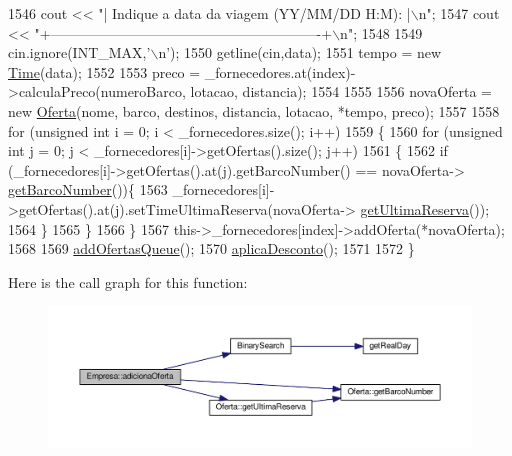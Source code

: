\begin{DoxyCode}
1546     cout << \textcolor{stringliteral}{"| Indique a data da viagem (YY/MM/DD H:M):                 |\(\backslash\)n"};
1547     cout << \textcolor{stringliteral}{"+----------------------------------------------------------+\(\backslash\)n"};
1548 
1549     cin.ignore(INT\_MAX,\textcolor{charliteral}{'\(\backslash\)n'});
1550     getline(cin,data);
1551     tempo = \textcolor{keyword}{new} \hyperlink{classTime}{Time}(data);
1552 
1553     preco = \_fornecedores.at(index)->calculaPreco(numeroBarco, lotacao, distancia);
1554     
1555     
1556     novaOferta = \textcolor{keyword}{new} \hyperlink{classOferta}{Oferta}(nome, barco, destinos, distancia, lotacao, *tempo, preco);
1557 
1558     \textcolor{keywordflow}{for} (\textcolor{keywordtype}{unsigned} \textcolor{keywordtype}{int} i = 0; i < \_fornecedores.size(); i++)
1559     \{
1560         \textcolor{keywordflow}{for} (\textcolor{keywordtype}{unsigned} \textcolor{keywordtype}{int} j = 0; j < \_fornecedores[i]->getOfertas().size(); j++)
1561         \{
1562             \textcolor{keywordflow}{if} (\_fornecedores[i]->getOfertas().at(j).getBarcoNumber() == novaOferta->
      \hyperlink{classOferta_abf0f062fa730edf6d4232926980b106c}{getBarcoNumber}())\{
1563                 \_fornecedores[i]->getOfertas().at(j).setTimeUltimaReserva(novaOferta->
      \hyperlink{classOferta_a1caf2c681c14c9fbd04312b35f99b64c}{getUltimaReserva}());
1564         \}
1565         \}
1566     \}
1567     this->\_fornecedores[index]->addOferta(*novaOferta);
1568 
1569     \hyperlink{classEmpresa_a5ca8821d938f11f29558ae90913de528}{addOfertasQueue}();
1570     \hyperlink{classEmpresa_a46a4898b8ae8e09bdf656b25b8ffe99d}{aplicaDesconto}();
1571 
1572 \}
\end{DoxyCode}


Here is the call graph for this function\+:
\nopagebreak
\begin{figure}[H]
\begin{center}
\leavevmode
\includegraphics[width=350pt]{classEmpresa_ae244a8ae3afb85eb5e9e5febce8b8728_cgraph}
\end{center}
\end{figure}


